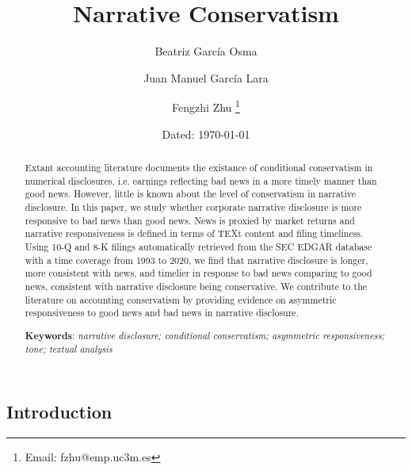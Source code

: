 \documentclass[a4paper]{article}
\begin{document}
	
	\title{Narrative Conservatism}
	
	\author{Beatriz Garc\'ia Osma}
	
	\author{Juan Manuel Garc\'ia Lara}
	
	\author{Fengzhi Zhu%
		\thanks{Email: fzhu@emp.uc3m.es}}
	
	
	\date{Dated: \today}
	
	\maketitle
\thispagestyle{empty}
\begin{spacing}{2}
\begin{abstract}
	Extant accounting literature documents the existance of conditional conservatism in numerical disclosures, i.e. earnings reflecting bad news in a more timely manner than good news. However, little is known about the level of conservatism in narrative disclosure. In this paper, we study whether corporate narrative disclosure is more responsive to bad news than good news. News is proxied by market returns and narrative responsiveness is defined in terms of TEXt content and filing timeliness. Using 10-Q and 8-K filings automatically retrieved from the SEC EDGAR database with a time coverage from 1993 to 2020, we find that narrative disclosure is longer, more consistent with news, and timelier in response to bad news comparing to good news, consistent with narrative disclosure being conservative. 
	We contribute to the literature on accounting conservatism by providing evidence on asymmetric responsiveness to good news and bad news in narrative disclosure.\\
	\newline
	
	\textbf{Keywords}: \textit{narrative disclosure;  conditional conservatism; asymmetric responsiveness; tone; textual analysis}
\end{abstract}

\clearpage

\setcounter{page}{1}
\section{Introduction}




\end{spacing}
\end{document}

